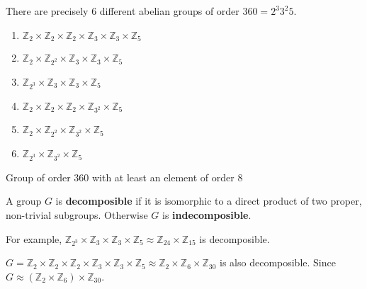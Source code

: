 \begin{remark}
	There are precisely $6$ different abelian groups of order $360 = 2^3 3^2 5$.
	\begin{enumerate}
		\item $\mathbb{Z}_2 \times \mathbb{Z}_2 \times \mathbb{Z}_2 \times \mathbb{Z}_3 \times \mathbb{Z}_3 \times \mathbb{Z}_5$ 
		\item $\mathbb{Z}_2 \times \mathbb{Z}_{2^2} \times \mathbb{Z}_3 \times \mathbb{Z}_3 \times \mathbb{Z}_5$
		\item $\mathbb{Z}_{2^3} \times \mathbb{Z}_3 \times \mathbb{Z}_3 \times \mathbb{Z}_5$
		\item $\mathbb{Z}_2 \times \mathbb{Z}_2 \times \mathbb{Z}_2 \times \mathbb{Z}_{3^2} \times \mathbb{Z}_5$
		\item $\mathbb{Z}_2 \times \mathbb{Z}_{2^2} \times \mathbb{Z}_{3^2} \times \mathbb{Z}_5$
		\item $\mathbb{Z}_{2^3} \times \mathbb{Z}_{3^2} \times \mathbb{Z}_5$
	\end{enumerate}
\end{remark}

\begin{question}
	Group of order 360 with at least an element of order 8
\end{question}

\begin{definition}
	A group $G$ is \textbf{decomposible} if it is isomorphic to a direct product of two proper, non-trivial subgroups.
	Otherwise $G$ is \textbf{indecomposible}.
\end{definition}

	For example, $\mathbb{Z}_{2^3} \times \mathbb{Z}_3 \times \mathbb{Z}_3 \times \mathbb{Z}_5 \approx \mathbb{Z}_{24} \times \mathbb{Z}_{15}$ is decomposible.

\begin{remark}
	$G = \mathbb{Z}_2 \times \mathbb{Z}_2 \times \mathbb{Z}_2 \times \mathbb{Z}_{3} \times \mathbb{Z}_3 \times \mathbb{Z}_5 \approx \mathbb{Z}_2 \times \mathbb{Z}_{6} \times \mathbb{Z}_{30}$ is also decomposible.
	Since $G \approx (\mathbb{Z}_2 \times \mathbb{Z}_{6}) \times \mathbb{Z}_{30}$.
\end{remark}

